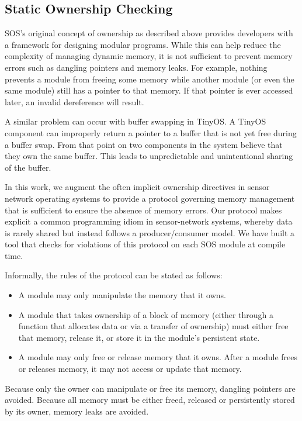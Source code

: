 
\subsection{Static Ownership Checking}

SOS's original concept of ownership as described above provides
developers with a framework for designing modular programs. While this
can help reduce the complexity of managing dynamic memory, it is not
sufficient to prevent memory errors such as dangling pointers and
memory leaks.  For example, nothing prevents a module from freeing
some memory while another module (or even the same module) still has a
pointer to that memory.  If that pointer is ever accessed later, an
invalid dereference will result.  

A similar problem can occur with buffer swapping in TinyOS.  A TinyOS
component can improperly return a pointer to a buffer that is not yet
free during a buffer swap.  From that point on two components in the
system believe that they own the same buffer.  This leads to
unpredictable and unintentional sharing of the buffer.

%
%

In this work, we augment the often implicit ownership directives in
sensor network operating systems to provide a protocol governing
memory management that is sufficient to ensure the absence of memory
errors.  Our protocol makes explicit a common programming idiom in
sensor-network systems, whereby data is rarely shared but instead
follows a producer/consumer model.  We have built a tool that checks
for violations of this protocol on each SOS module at compile time.

Informally, the rules of the protocol can be stated as follows:
%
\begin{itemize}
%
\item A module may only manipulate the memory that it owns.
%
\item A module that takes ownership of a block of memory (either
through a function that allocates data or via a transfer of ownership)
must either free that memory, release it, or store it in the module's
persistent state.
%
\item A module may only free or release memory that it owns.  After a
module frees or releases memory, it may not access or update that
memory.
%
\end{itemize}
%
Because only the owner can manipulate or free its memory, dangling
pointers are avoided.  Because all memory must be either freed,
released or persistently stored by its owner, memory leaks are
avoided.


